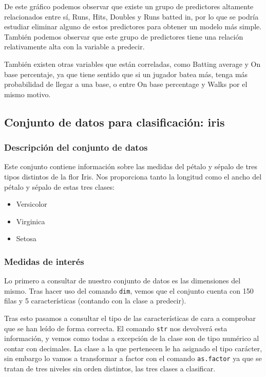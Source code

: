 De este gráfico podemos observar que existe un grupo de predictores altamente relacionados entre sí, Runs, Hits, Doubles y Runs batted in, por lo que se podría estudiar eliminar alguno de estos predictores para obtener un modelo más simple. También podemos observar que este grupo de predictores tiene una relación relativamente alta con la variable a predecir.

También existen otras variables que están correladas, como Batting average y On base percentaje, ya que tiene sentido que si un jugador batea más, tenga más probabilidad de llegar a una base, o entre On base percentage y Walks por el mismo motivo.


\subsection{Conjunto de datos para clasificación: iris}

\subsubsection{Descripción del conjunto de datos}

Este conjunto contiene información sobre las medidas del pétalo y sépalo de tres tipos distintos de la flor Iris. Nos proporciona tanto la longitud como el ancho del pétalo y sépalo de estas tres clases:

\begin{itemize}
	\item Versicolor
	\item Virginica
	\item Setosa
\end{itemize}

\subsubsection{Medidas de interés}

Lo primero a consultar de nuestro conjunto de datos es las dimensiones del mismo. Tras hacer uso del comando \texttt{dim}, vemos que el conjunto cuenta con 150 filas y 5 características (contando con la clase a predecir).

Tras esto pasamos a consultar el tipo de las características de cara a comprobar que se han leído de forma correcta. El comando \texttt{str} nos devolverá esta información, y vemos como todas a excepción de la clase son de tipo numérico al contar con decimales. La clase a la que pertenecen le ha asignado el tipo carácter, sin embargo lo vamos a transformar a factor con el comando \texttt{as.factor} ya que se tratan de tres niveles sin orden distintos, las tres clases a clasificar.


